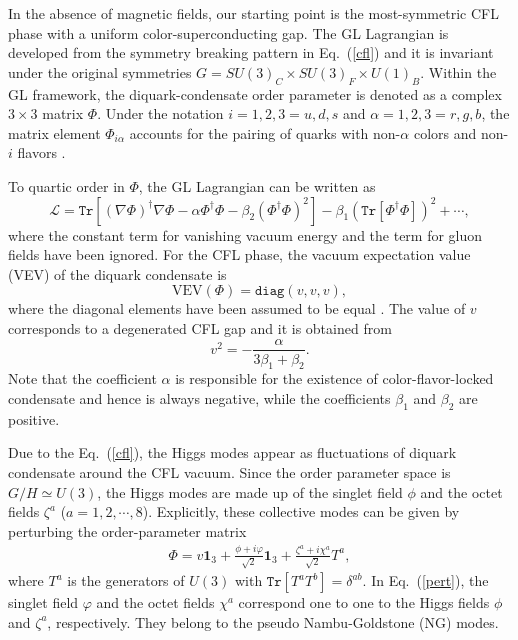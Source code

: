 \documentclass[prd, showpacs,nofootinbib,amsmath,amssymb]{revtex4}
\begin{document}
In the absence of magnetic fields, our starting point is the most-symmetric CFL phase with a uniform
color-superconducting gap. The GL Lagrangian is developed from the symmetry breaking pattern in Eq.~(\ref{cfl}) and it is invariant
under the original symmetries $G=SU(3)_C \times SU(3)_F\times U(1)_B$. Within the GL framework, the
diquark-condensate order parameter is denoted as a complex $3\times3$ matrix $\Phi$. Under the notation
$i = 1, 2, 3 = u, d, s$ and $\alpha = 1, 2, 3 = r, g, b$, the matrix element $\Phi_{i \alpha}$ accounts
for the pairing of quarks with non-$\alpha$ colors and non-$i$ flavors \cite{iida2002superfluid}.

To quartic order in $\Phi$, the GL Lagrangian can be written as~\cite{iida2002superfluid,giannakis2002ginzburg}
\begin{equation}
\mathcal{L}=
\texttt{Tr}\left[(\nabla\Phi)^\dagger\nabla\Phi
  -\alpha\Phi^\dagger\Phi -\beta_2(\Phi^\dagger\Phi)^2\right]
-\beta_1(\texttt{Tr}[\Phi^\dagger\Phi])^2 +\cdots ,\label{gl}
\end{equation}
where the constant term for vanishing vacuum energy and the term for gluon fields have been
ignored. For the CFL phase, the vacuum expectation value (VEV) of the diquark condensate is
\begin{equation}
  \text{VEV}(\Phi)=\texttt{diag}(v,v,v) ,\label{cflground}
\end{equation}
where the diagonal elements have been assumed to be equal \cite{iida2002superfluid}. The value of
$v$ corresponds to a degenerated CFL gap and it is obtained from
\begin{equation}
  \label{eq:dvaccum}
v^2 = -\frac{\alpha}{3\beta_1+\beta_2}.
\end{equation}
Note that the coefficient $\alpha$ is responsible for the existence of color-flavor-locked condensate
and hence is always negative, while the coefficients $\beta_1$ and $\beta_2$ are positive.

Due to the Eq.~(\ref{cfl}), the Higgs modes appear as fluctuations of diquark condensate around the
CFL vacuum. Since the order parameter space is $G/H \simeq U(3)$, the Higgs modes are made up of the
singlet field $\phi$ and the octet fields $\zeta^a$ ($a = 1, 2, \cdots, 8$). Explicitly, these
collective modes can be given by perturbing the order-parameter matrix
\begin{eqnarray}
\Phi=v\textbf{1}_3+\frac{\phi+i\varphi}{\sqrt{2}}\textbf{1}_3+\frac{\zeta^a+i\chi^a}{\sqrt{2}}T^a,
\label{pert}
\end{eqnarray}
where $T^a$ is the generators of $U(3)$ with $\texttt{Tr}[T^a T^b]=\delta^{ab}$.
In Eq.~(\ref{pert}), the singlet field $\varphi$ and the octet fields $\chi^a$ correspond one to
one to the Higgs fields $\phi$ and $\zeta^a$, respectively. They belong to the pseudo Nambu-Goldstone
(NG) modes.
\end{document}
